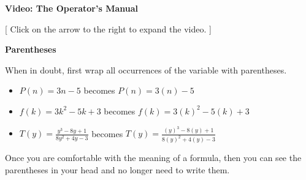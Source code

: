 \documentclass{ximera}
\begin{document}
\begin{explanation} \textbf{Video: The Operator's Manual}

[ Click on the arrow to the right to expand the video. ]
\begin{expandable} 

\begin{center}
\end{center}

\end{expandable}
\end{explanation}











\begin{example}   \textbf{\textcolor{blue!55!black}{Parentheses}}  

When in doubt, first wrap all occurrences of the variable with parentheses.
\begin{itemize}
\item $P(n) = 3n - 5$ becomes $P(n) = 3(n) - 5$ \\

\item $f(k) = 3k^2 - 5k + 3$ becomes $f(k) = 3(k)^2 - 5(k) + 3$ \\

\item $T(y) = \frac{y^3 - 8y + 1}{8y^2 + 4y - 3}$ becomes $T(y) = \frac{(y)^3 - 8(y) + 1}{8(y)^2 + 4(y) - 3}$
\end{itemize}

\end{example}

Once you are comfortable with the meaning of a formula, then you can see the parentheses in your head and no longer need to write them.
\end{document}
